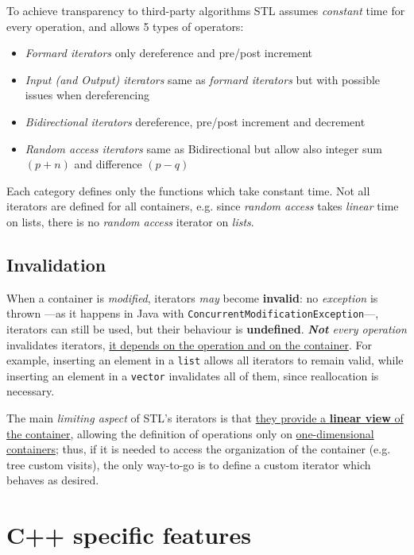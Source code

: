 To achieve transparency to third-party algorithms STL assumes \textit{constant} time for every operation, and allows 5 types of operators:
\begin{itemize}
  \item \textit{Formard iterators} only dereference and pre/post increment
  \item \textit{Input (and Output) iterators} same as \textit{formard iterators} but with possible issues when dereferencing
  \item \textit{Bidirectional iterators} dereference, pre/post increment and decrement
  \item \textit{Random access iterators} same as Bidirectional but allow also integer sum $(p + n)$ and difference $(p - q)$
\end{itemize}
Each category defines only the functions which take constant time. Not all iterators are defined for all
containers, e.g. since \textit{random access} takes \textit{linear} time on lists,
there is no \textit{random access} iterator on \textit{lists}.

\subsection{Invalidation}
When a container is \textit{modified},
iterators \textit{may} become \textbf{invalid}:
no \textit{exception} is thrown ---as it happens in Java with \lstinline|ConcurrentModificationException|---,
iterators can still be used,
but their behaviour is \textbf{undefined}.
\textit{\textbf{Not} every operation} invalidates iterators,
\ul{it depends on the operation and on the container}.
For example, inserting an element in a \lstinline|list| allows all iterators to remain valid, while inserting an element in a \lstinline|vector| invalidates all of them, since reallocation is necessary.
\nl

The main \textit{limiting aspect} of STL's iterators is that \ul{they provide a \textbf{linear view} of the container},
allowing the definition of operations only on \ul{one-dimensional containers};
thus, if it is needed to access the organization of the container (e.g. tree custom visits), the only way-to-go is to define a custom iterator which behaves as desired.

\section{C++ specific features}

